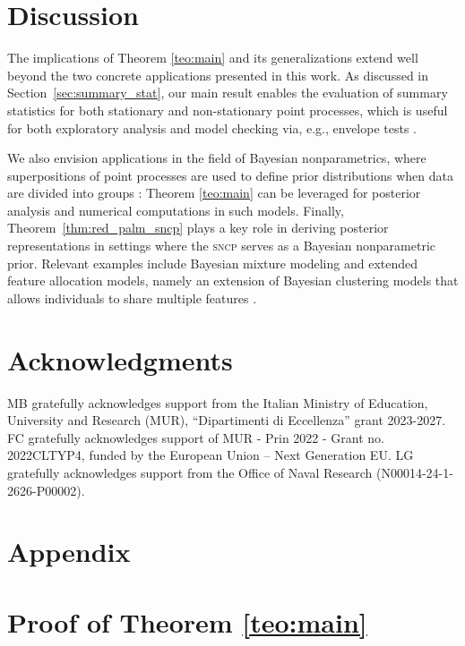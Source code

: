 \documentclass[11pt,a4paper,oneside]{article}
\theoremstyle{definition}
\theoremstyle{remark}
\begin{document}
\section{Discussion}


The implications of Theorem \ref{teo:main} and its generalizations extend well beyond the two concrete applications presented in this work. As discussed in Section~\ref{sec:summary_stat}, our main result enables the evaluation of summary statistics for both stationary and non-stationary point processes, which is useful for both exploratory analysis and model checking via, e.g., envelope tests  \citep{Chiu2013}.



We also envision applications in the field of Bayesian nonparametrics, where superpositions of point processes are used to define prior distributions when data are divided into groups \citep{Nip14, griffin2013comparing}: Theorem \ref{teo:main} can be leveraged for posterior analysis and numerical computations in such models.
Finally, Theorem~\ref{thm:red_palm_sncp} plays a key role in deriving posterior representations in settings where the \textsc{sncp} serves as a Bayesian nonparametric prior. Relevant examples include Bayesian mixture modeling \citep{Beraha2025JRSSB} and extended feature allocation models, namely an extension of Bayesian clustering models that allows individuals to share multiple features \citep{beraha2025extended}.




\section*{Acknowledgments}
{
MB gratefully acknowledges support from the Italian Ministry of Education, University and Research (MUR), “Dipartimenti di Eccellenza” grant 2023-2027.
FC gratefully acknowledges support of MUR - Prin 2022 - Grant no. 2022CLTYP4, funded by the European Union – Next Generation EU. LG gratefully acknowledges support from the Office of Naval Research (N00014-24-1-2626-P00002).}


\section*{Appendix}
\section*{Proof of Theorem \ref{teo:main}}
\end{document}
